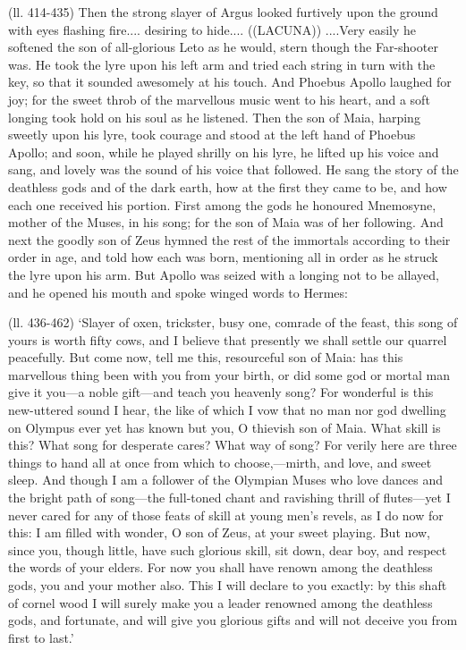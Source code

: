 (ll. 414-435) Then the strong slayer of Argus looked furtively upon the ground
with eyes flashing fire.... desiring to hide.... ((LACUNA)) ....Very easily he
softened the son of all-glorious Leto as he would, stern though the Far-shooter
was. He took the lyre upon his left arm and tried each string in turn with the
key, so that it sounded awesomely at his touch. And Phoebus Apollo laughed for
joy; for the sweet throb of the marvellous music went to his heart, and a soft
longing took hold on his soul as he listened. Then the son of Maia, harping
sweetly upon his lyre, took courage and stood at the left hand of Phoebus
Apollo; and soon, while he played shrilly on his lyre, he lifted up his voice
and sang, and lovely was the sound of his voice that followed. He sang the
story of the deathless gods and of the dark earth, how at the first they came
to be, and how each one received his portion. First among the gods he honoured
Mnemosyne, mother of the Muses, in his song; for the son of Maia was of her
following. And next the goodly son of Zeus hymned the rest of the immortals
according to their order in age, and told how each was born, mentioning all in
order as he struck the lyre upon his arm. But Apollo was seized with a longing
not to be allayed, and he opened his mouth and spoke winged words to Hermes:

(ll. 436-462) ‘Slayer of oxen, trickster, busy one, comrade of the feast,
this song of yours is worth fifty cows, and I believe that presently we shall
settle our quarrel peacefully. But come now, tell me this, resourceful son of
Maia: has this marvellous thing been with you from your birth, or did some god
or mortal man give it you—a noble gift—and teach you heavenly song?
For wonderful is this new-uttered sound I hear, the like of which I vow that no
man nor god dwelling on Olympus ever yet has known but you, O thievish son of
Maia. What skill is this? What song for desperate cares? What way of song? For
verily here are three things to hand all at once from which to
choose,—mirth, and love, and sweet sleep. And though I am a follower of
the Olympian Muses who love dances and the bright path of song—the
full-toned chant and ravishing thrill of flutes—yet I never cared for any
of those feats of skill at young men’s revels, as I do now for this: I am
filled with wonder, O son of Zeus, at your sweet playing. But now, since you,
though little, have such glorious skill, sit down, dear boy, and respect the
words of your elders. For now you shall have renown among the deathless gods,
you and your mother also. This I will declare to you exactly: by this shaft of
cornel wood I will surely make you a leader renowned among the deathless gods,
and fortunate, and will give you glorious gifts and will not deceive you from
first to last.’

